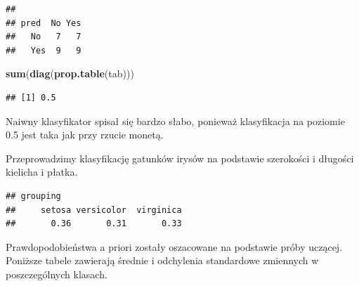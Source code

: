 \documentclass[]{book}
\newenvironment{Shaded}{\begin{snugshade}}{\end{snugshade}}
\newcommand{\DataTypeTok}[1]{\textcolor[rgb]{0.13,0.29,0.53}{#1}}
\newcommand{\DecValTok}[1]{\textcolor[rgb]{0.00,0.00,0.81}{#1}}
\newcommand{\KeywordTok}[1]{\textcolor[rgb]{0.13,0.29,0.53}{\textbf{#1}}}
\newcommand{\NormalTok}[1]{#1}
\newcommand{\OperatorTok}[1]{\textcolor[rgb]{0.81,0.36,0.00}{\textbf{#1}}}
\newcommand{\StringTok}[1]{\textcolor[rgb]{0.31,0.60,0.02}{#1}}
\theoremstyle{plain}
\theoremstyle{definition}
\theoremstyle{definition}
\theoremstyle{definition}
\theoremstyle{definition}
\theoremstyle{remark}
\let\BeginKnitrBlock\begin \let\EndKnitrBlock\end
\begin{document}
\begin{verbatim}
##      
## pred  No Yes
##   No   7   7
##   Yes  9   9
\end{verbatim}

\begin{Shaded}
\begin{Highlighting}[]
\KeywordTok{sum}\NormalTok{(}\KeywordTok{diag}\NormalTok{(}\KeywordTok{prop.table}\NormalTok{(tab)))}
\end{Highlighting}
\end{Shaded}

\begin{verbatim}
## [1] 0.5
\end{verbatim}

Naiwny klasyfikator spisał się bardzo słabo, ponieważ klasyfikacja na poziomie 0.5 jest taka jak przy rzucie monetą.

\BeginKnitrBlock{example}
\protect\hypertarget{exm:unnamed-chunk-78}{}{\label{exm:unnamed-chunk-78} }Przeprowadzimy klasyfikację gatunków irysów na podstawie szerokości i długości kielicha i płatka.
\EndKnitrBlock{example}

\begin{Shaded}
\end{Shaded}

\begin{verbatim}
## grouping
##     setosa versicolor  virginica 
##       0.36       0.31       0.33
\end{verbatim}

Prawdopodobieństwa a priori zostały oszacowane na podstawie próby uczącej. Poniższe tabele zawierają średnie i odchylenia standardowe zmiennych w poszczególnych klasach.

\begin{Shaded}
\end{Shaded}
\end{document}
